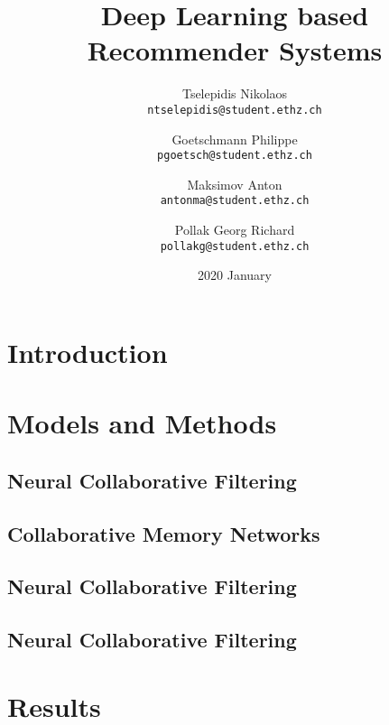 \documentclass[
  twoColumns,
  fontsize=10pt,
  baseClass=extarticle
]{formularyETH/formularyETH}
\title{Deep Learning based Recommender Systems}
\author{
Tselepidis Nikolaos \\
\small{\texttt{ntselepidis@student.ethz.ch}}
    \and
Goetschmann Philippe \\
\small{\texttt{pgoetsch@student.ethz.ch}}
    \and
Maksimov Anton \\
\small{\texttt{antonma@student.ethz.ch}}
    \and
Pollak Georg Richard \\
\small{\texttt{pollakg@student.ethz.ch}}
}
\date{2020 January}
\begin{document}
\twocolumn[{%
  \begin{@twocolumnfalse} 
  \centering
  \maketitle
  \begin{abstract}
    
  \end{abstract}
  \end{@twocolumnfalse}
}]

\section*{Introduction}\label{sec:introduction}

\section*{Models and Methods}\label{sec:models_and_methods}
\subsection*{Neural Collaborative Filtering}\label{subsec:neural_collaborative_filtering}

\subsection*{Collaborative Memory Networks}\label{subsec:CollaborativeMemoryNetwork}

\subsection*{Neural Collaborative Filtering}\label{subsec:neural_collaborative_filtering}

\subsection*{Neural Collaborative Filtering}\label{subsec:neural_collaborative_filtering}


\section*{Results}\label{sec:results}

\end{document}
